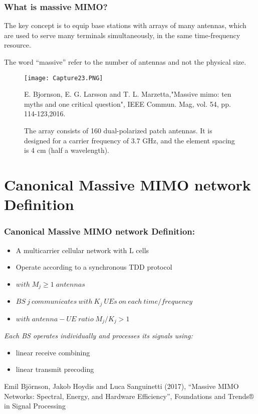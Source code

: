 \documentclass{beamer}
\begin{document}
\begin{frame}[t,fragile=singleslide]\frametitle{What is massive MIMO?}
The key concept is to equip base stations with arrays of many antennas, which are used to serve many terminals simultaneously, in the same time-frequency resource. 


The word “massive” refer to the number of antennas and not the physical size.
\begin{figure}
  \texttt{[image: Capture23.PNG]}
  \caption{\tiny The array consists of 160 dual-polarized patch antennas. It is designed for a carrier frequency of 3.7 GHz, and the element spacing is 4 cm (half a wavelength).}
\tiny E. Bjornson, E. G. Larsson and T. L. Marzetta,"Massive mimo: ten myths and one critical question", IEEE Commun. Mag, vol. 54, pp. 114-123,2016.
\end{figure}

\end{frame}

\section{Canonical Massive MIMO network Definition}

\begin{frame}[fragile=singleslide]\frametitle{Canonical Massive MIMO network Definition:}
\begin{itemize}
\item A multicarrier cellular network with L cells
\item Operate according to a synchronous TDD protocol
\item $with \; M_{j} \geq 1 \;antennas$
\item $BS \ j \ communicates \ with \ K_{j} \ UEs \ on \ each \ time/frequency$
\item $with\; antenna-UE\; ratio\; M_{j}/K_{j} > 1$
\end{itemize}
\vspace{0.75cm}
\textit{Each BS operates individually and processes its signals using:}
\begin{itemize}
\item linear receive combining
\item linear transmit precoding
\end{itemize}

\vspace{1cm}

\tiny Emil Björnson, Jakob Hoydis and Luca Sanguinetti (2017), “Massive MIMO Networks: Spectral, Energy, and Hardware Efficiency”, Foundations and Trends® in Signal Processing
\end{frame}
\end{document}
